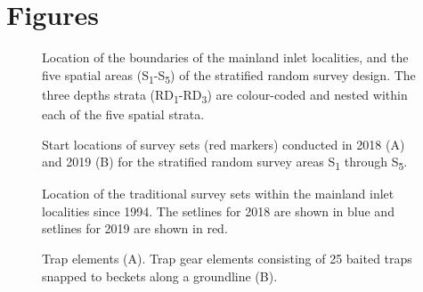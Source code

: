 \documentclass[12pt]{article}\usepackage[]{graphicx}\usepackage[]{color}
\begin{document}
\hypertarget{figures}{%
\section{Figures}\label{figures}}


\begin{figure}[htb]

{\centering {} 

}

\caption{Location of the boundaries of the mainland inlet localities, and the five spatial areas (S\textsubscript{1}-S\textsubscript{5}) of the stratified random survey design. The three depths strata (RD\textsubscript{1}-RD\textsubscript{3}) are colour-coded and nested within each of the five spatial strata.}\label{fig:figure1}
\end{figure}
\clearpage


\begin{figure}[htb]

{\centering {} 

}

\caption{Start locations of survey sets (red markers) conducted in 2018 (A) and 2019 (B) for the stratified random survey areas S\textsubscript{1} through S\textsubscript{5}.}\label{fig:figure2}
\end{figure}
\clearpage


\begin{figure}[htb]

{\centering {} 

}

\caption{Location of the traditional survey sets within the mainland inlet localities since 1994. The setlines for 2018 are shown in blue and setlines for 2019 are shown in red.}\label{fig:figure3}
\end{figure}
\clearpage


\begin{figure}[htb]

{\centering {} 

}

\caption{Trap elements (A). Trap gear elements consisting of 25 baited traps snapped to beckets along a groundline (B).}\label{fig:figure4}
\end{figure}
\clearpage
\end{document}
